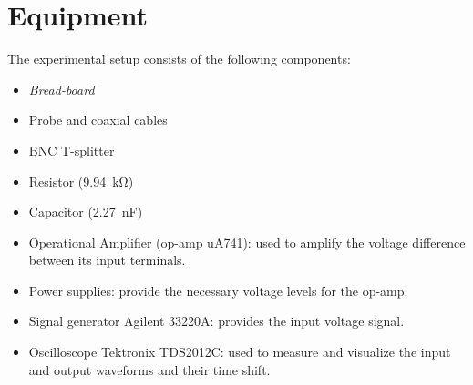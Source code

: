 \section{Equipment}
The experimental setup consists of the following components:

\begin{itemize}
    
    \item \emph{Bread-board}
	\item Probe and coaxial cables
    \item BNC T-splitter
	\item Resistor (\SI{9.94}{\kilo\ohm})
	\item Capacitor (\SI{2.27}{\nano\farad})
    \item Operational Amplifier (op-amp uA741): used to amplify the voltage difference between its input terminals.    
    \item Power supplies: provide the necessary voltage levels for the op-amp.
    \item Signal generator Agilent 33220A: provides the input voltage signal.
    \item Oscilloscope Tektronix TDS2012C: used to measure and visualize the input and output waveforms and their time shift.

\end{itemize}
